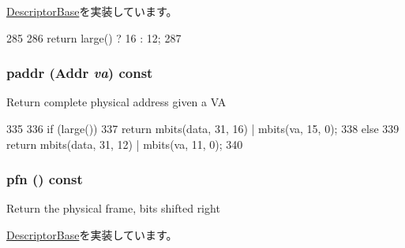 \hyperlink{classArmISA_1_1TableWalker_1_1DescriptorBase_a21735b91214af921462c578b766a01ae}{DescriptorBase}を実装しています。


\begin{DoxyCode}
285         {
286             return large() ? 16 : 12;
287         }
\end{DoxyCode}
\hypertarget{classArmISA_1_1TableWalker_1_1L2Descriptor_a4fd8dbd54f4412ba92edbf632940c8de}{
\subsubsection[{paddr}]{ paddr ({\bf Addr} {\em va}) const}}
\label{classArmISA_1_1TableWalker_1_1L2Descriptor_a4fd8dbd54f4412ba92edbf632940c8de}
Return complete physical address given a VA 


\begin{DoxyCode}
335         {
336             if (large())
337                 return mbits(data, 31, 16) | mbits(va, 15, 0);
338             else
339                 return mbits(data, 31, 12) | mbits(va, 11, 0);
340         }
\end{DoxyCode}
\hypertarget{classArmISA_1_1TableWalker_1_1L2Descriptor_ae6bfcb957f6df6777f3294e78ac298af}{
\subsubsection[{pfn}]{ pfn () const}}
\label{classArmISA_1_1TableWalker_1_1L2Descriptor_ae6bfcb957f6df6777f3294e78ac298af}
Return the physical frame, bits shifted right 

\hyperlink{classArmISA_1_1TableWalker_1_1DescriptorBase_a5e759a05b3056231f9f65a12f46c6a12}{DescriptorBase}を実装しています。


